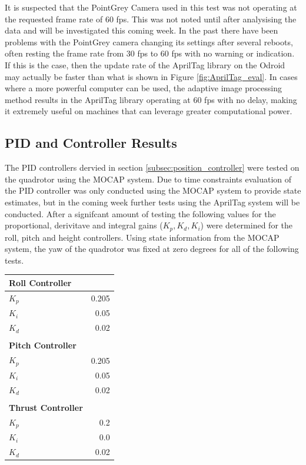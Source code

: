 \documentclass[11pt, twocolumn]{article}
\begin{document}
It is suspected that the PointGrey Camera used in this test was not operating at the requested frame rate of 60 fps. This was not noted until after analysising the data and will be investigated this coming week. In the past there have been problems with the PointGrey camera changing its settings after several reboots, often resting the frame rate from 30 fps to 60 fps with no warning or indication. If this is the case, then the update rate of the AprilTag library on the Odroid may actually be faster than what is shown in Figure \ref{fig:AprilTag_eval}. In cases where a more powerful computer can be used, the adaptive image processing method results in the AprilTag library operating at 60 fps with no delay, making it extremely useful on machines that can leverage greater computational power. 

\subsection{PID and Controller Results}
The PID controllers dervied in section \ref{subsec:position_controller} were tested on the quadrotor using the MOCAP system. Due to time constraints evaluation of the PID controller was only conducted using the MOCAP system to provide state estimates, but in the coming week further tests using the AprilTag system will be conducted. After a signifcant amount of testing the following values for the proportional, derivitave and integral gains ($K_p, K_d, K_i$) were determined for the roll, pitch and height controllers. Using state information from the MOCAP system, the yaw of the quadrotor was fixed at zero degrees for all of the following tests. 

\begin{center}
	\vspace{-0.4cm}
	\begin{tabular}{l r}
		\hline
		\textbf{Roll Controller} \\
		\hline
		$K_{p}$ &  0.205 \\
		$K_{i}$ & 0.05 \\
		$K_{d}$ &  0.02 \\
		\\
		\hline
		\textbf{Pitch Controller} \\
		\hline
		$K_{p}$ & 0.205 \\
		$K_{i}$ & 0.05 \\
		$K_{d}$ & 0.02 \\
		\\
		\hline
		\textbf{Thrust Controller} \\
		\hline
		$K_{p}$ & 0.2 \\
		$K_{i}$ & 0.0 \\
		$K_{d}$ & 0.02 \\
	\end{tabular}
\end{center}
\end{document}
